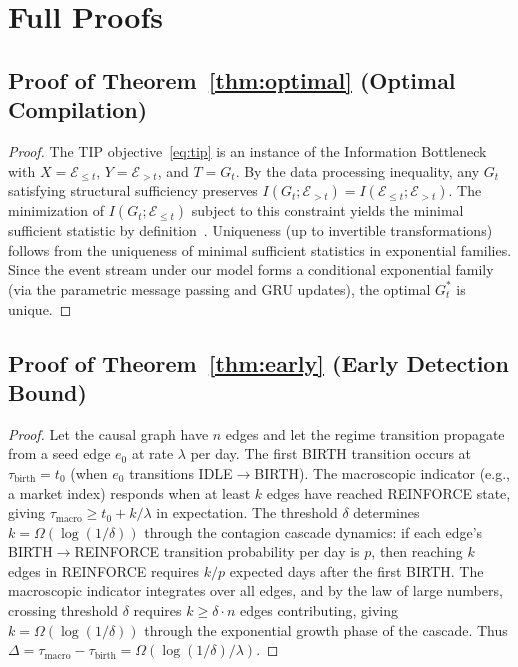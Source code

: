 \documentclass[11pt]{article}
\begin{document}
\newpage
\appendix

\section{Full Proofs}

\subsection{Proof of Theorem~\ref{thm:optimal} (Optimal Compilation)}

\begin{proof}
The TIP objective~\eqref{eq:tip} is an instance of the Information Bottleneck~\citep{tishby2000ib} with $X = \mathcal{E}_{\leq t}$, $Y = \mathcal{E}_{>t}$, and $T = G_t$. By the data processing inequality, any $G_t$ satisfying structural sufficiency preserves $I(G_t; \mathcal{E}_{>t}) = I(\mathcal{E}_{\leq t}; \mathcal{E}_{>t})$. The minimization of $I(G_t; \mathcal{E}_{\leq t})$ subject to this constraint yields the minimal sufficient statistic by definition~\citep{tishby2000ib}. Uniqueness (up to invertible transformations) follows from the uniqueness of minimal sufficient statistics in exponential families. Since the event stream under our model forms a conditional exponential family (via the parametric message passing and GRU updates), the optimal $G_t^*$ is unique.
\end{proof}

\subsection{Proof of Theorem~\ref{thm:early} (Early Detection Bound)}

\begin{proof}
Let the causal graph have $n$ edges and let the regime transition propagate from a seed edge $e_0$ at rate $\lambda$ per day. The first BIRTH transition occurs at $\tau_{\text{birth}} = t_0$ (when $e_0$ transitions IDLE$\to$BIRTH). The macroscopic indicator (e.g., a market index) responds when at least $k$ edges have reached REINFORCE state, giving $\tau_{\text{macro}} \geq t_0 + k/\lambda$ in expectation. The threshold $\delta$ determines $k = \Omega(\log(1/\delta))$ through the contagion cascade dynamics: if each edge's BIRTH$\to$REINFORCE transition probability per day is $p$, then reaching $k$ edges in REINFORCE requires $k/p$ expected days after the first BIRTH. The macroscopic indicator integrates over all edges, and by the law of large numbers, crossing threshold $\delta$ requires $k \geq \delta \cdot n$ edges contributing, giving $k = \Omega(\log(1/\delta))$ through the exponential growth phase of the cascade. Thus $\Delta = \tau_{\text{macro}} - \tau_{\text{birth}} = \Omega(\log(1/\delta) / \lambda)$.
\end{proof}
\end{document}
